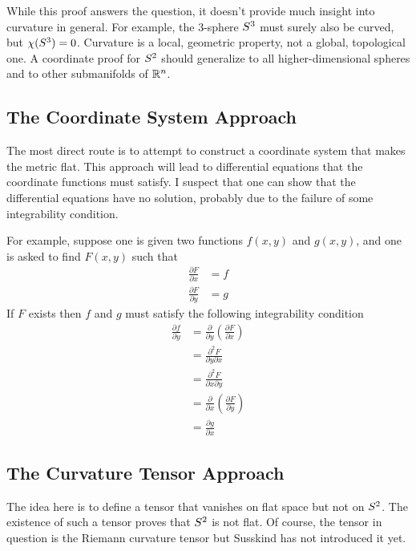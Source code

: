 \documentclass[11pt, oneside]{article}
\begin{document}
While this proof answers the question, it doesn't provide much insight into curvature in general.
For example, the 3-sphere $S^3$ must surely also be curved, but $\chi(S^3) = 0$.
Curvature is a local, geometric property, not a global, topological one.
A coordinate proof for $S^2$ should generalize to all higher-dimensional spheres and to other submanifolds of $\mathbb{R}^n$.

\subsection{The Coordinate System Approach}
 
The most direct route is to attempt to construct a coordinate system that makes the metric flat.
This approach will lead to differential equations that the coordinate functions must satisfy.
I suspect that one can show that the differential equations have no solution, probably due to the failure of some
integrability condition.

For example, suppose one is given two functions $f(x,y)$ and $g(x,y)$, and one is asked to find $F(x,y)$ such that
\begin{align}
	\frac{\partial F}{\partial x}	&= f \\
	\frac{\partial F}{\partial y}	&= g
\end{align}
If $F$ exists then $f$ and $g$ must satisfy the following integrability condition
\begin{equation}
\begin{split}
	\frac{\partial f}{\partial y} 	& = \frac{\partial}{\partial y} \left( \frac{\partial F}{\partial x} \right) \\
						& = \frac{\partial^2 F}{\partial y \partial x} \\
						& = \frac{\partial^2 F}{\partial x \partial y} \\
						& = \frac{\partial}{\partial x} \left( \frac{\partial F}{\partial y} \right) \\
						& = \frac{\partial g}{\partial x}
	\end{split}
\end{equation}

\subsection{The Curvature Tensor Approach}

The idea here is to define a tensor that vanishes on flat space but not on $S^2$.
The existence of such a tensor proves that $S^2$ is not flat.
Of course, the tensor in question is the Riemann curvature tensor but Susskind has not introduced it yet.
\end{document}
